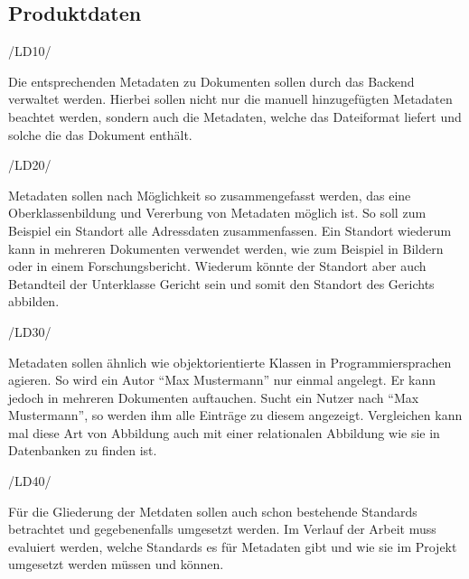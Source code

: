 \subsection{Produktdaten} \label{Produktdaten}
\begin{minipage}{3cm}
/LD10/
\end{minipage}
\begin{minipage}{13cm}
Die entsprechenden Metadaten zu Dokumenten sollen durch das Backend verwaltet werden. Hierbei sollen nicht nur die manuell hinzugef\"ugten Metadaten beachtet werden, sondern auch die Metadaten, welche das Dateiformat liefert und solche die das Dokument enth\"alt.\\
\end{minipage}
\begin{minipage}{3cm}
/LD20/
\end{minipage}
\begin{minipage}{13cm}
Metadaten sollen nach M\"oglichkeit so zusammengefasst werden, das eine Oberklassenbildung und Vererbung von Metadaten m\"oglich ist. So soll zum Beispiel ein Standort alle Adressdaten zusammenfassen. Ein Standort wiederum kann in mehreren Dokumenten verwendet werden, wie zum Beispiel in Bildern oder in einem Forschungsbericht. Wiederum k\"onnte der Standort aber auch Betandteil der Unterklasse Gericht sein und somit den Standort des Gerichts abbilden.\\
\end{minipage}
\begin{minipage}{3cm}
/LD30/
\end{minipage}
\begin{minipage}{13cm}
Metadaten sollen \"ahnlich wie objektorientierte Klassen in Programmiersprachen agieren. So wird ein Autor "`Max Mustermann"' nur einmal angelegt. Er kann jedoch in mehreren Dokumenten auftauchen. Sucht ein Nutzer nach "`Max Mustermann"', so werden ihm alle Eintr\"age zu diesem angezeigt. Vergleichen kann mal diese Art von Abbildung auch mit einer relationalen Abbildung wie sie in Datenbanken zu finden ist.\\
\end{minipage}
\begin{minipage}{3cm}
/LD40/
\end{minipage}
\begin{minipage}{13cm}
F\"ur die Gliederung der Metdaten sollen auch schon bestehende Standards betrachtet und gegebenenfalls umgesetzt werden.
Im Verlauf der Arbeit muss evaluiert werden, welche Standards es f\"ur Metadaten gibt und wie sie im Projekt umgesetzt werden m\"ussen und k\"onnen.
\cite{Wiki_Dublin_Core} \cite{Wiki_ISO_19115} \cite{Wiki_Exif} \cite{Wiki_Inspire}\\
\end{minipage}


